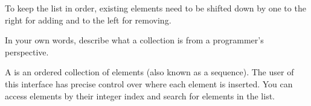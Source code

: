 \begin{answer}
To keep the list in order, existing elements need to be shifted down by one to the right for adding and to the left for removing.
\end{answer}


\Q In your own words, describe what a  collection is from a programmer's perspective.

\begin{answer}[5em]
A  is an ordered collection of elements (also known as a sequence).
The user of this interface has precise control over where  each element is inserted.
You can access elements by their integer index and search for elements in the list.
\end{answer}
